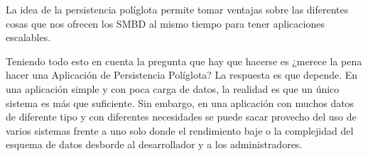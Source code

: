 \documentclass[conference]{IEEEtran}
\begin{document}
  La idea de la persistencia pol\'iglota permite tomar ventajas sobre las diferentes cosas que nos ofrecen los SMBD al mismo tiempo para tener aplicaciones escalables. 

  Teniendo todo esto en cuenta la pregunta que hay que hacerse es ¿merece la pena hacer una Aplicaci\'on de Persistencia Pol\'iglota? La respuesta es que depende. En una aplicaci\'on simple y con poca carga de datos, la realidad es que un \'unico sistema es más que suficiente. Sin embargo, en una aplicaci\'on con muchos datos de diferente tipo y con diferentes necesidades se puede sacar provecho del uso de varios sistemas frente a uno solo donde el rendimiento baje o la complejidad del esquema de datos desborde al desarrollador y a los administradores.


\ifCLASSOPTIONcaptionsoff
  \newpage
\fi




\end{document}
